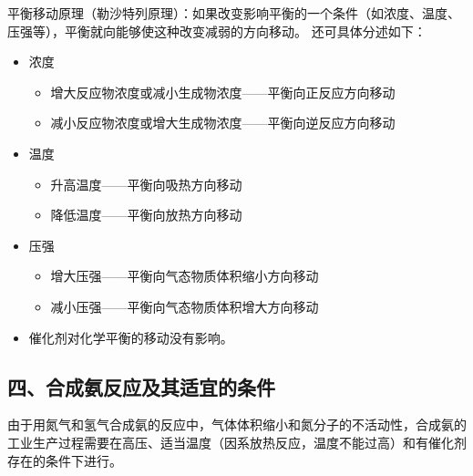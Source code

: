 平衡移动原理（勒沙特列原理）：如果改变影响平衡的一个条件（如浓度、温度、压强等），平衡就向能够使这种改变减弱的方向移动。
还可具体分述如下：
\begin{itemize}
  \item 浓度
  \begin{itemize}
    \item 增大反应物浓度或减小生成物浓度——平衡向正反应方向移动
    \item 减小反应物浓度或增大生成物浓度——平衡向逆反应方向移动
  \end{itemize}
  \item 温度
  \begin{itemize}
    \item 升高温度——平衡向吸热方向移动
    \item 降低温度——平衡向放热方向移动
  \end{itemize}
  \item 压强
  \begin{itemize}
    \item 增大压强——平衡向气态物质体积缩小方向移动
    \item 减小压强——平衡向气态物质体积增大方向移动
  \end{itemize}
  \item 催化剂对化学平衡的移动没有影响。
\end{itemize}

\subsection*{四、合成氨反应及其适宜的条件}
由于用氮气和氢气合成氨的反应中，气体体积缩小和氮分子的不活动性，合成氨的工业生产过程需要在高压、适当温度（因系放热反应，温度不能过高）和有催化剂存在的条件下进行。

